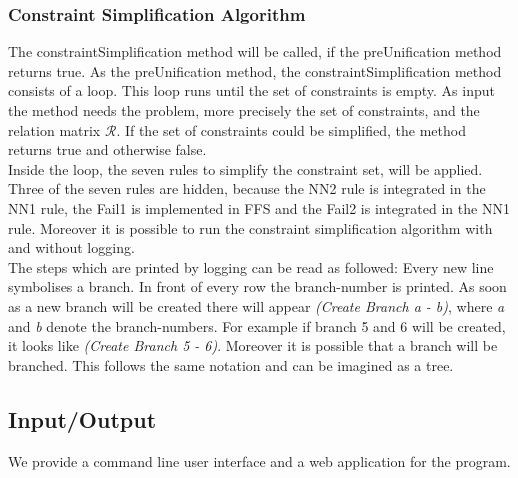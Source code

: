 \documentclass{article}
\begin{document}

\subsubsection{Constraint Simplification Algorithm}
The constraintSimplification method will be called, if the preUnification method returns true. As the preUnification method, the constraintSimplification method consists of a loop. This loop runs until the set of constraints is empty. As input the method needs the problem, more precisely the set of constraints, and the relation matrix \(\mathcal{R}\). If the set of constraints could be simplified, the method returns true and otherwise false.\\
Inside the loop, the seven rules to simplify the constraint set, will be applied. Three of the seven rules are hidden, because the NN2 rule is integrated in the NN1 rule, the Fail1 is implemented in FFS and the Fail2 is integrated in the NN1 rule. Moreover it is possible to run the constraint simplification algorithm with and without logging. \\
The steps which are printed by logging can be read as followed: 
Every new line symbolises a branch. In front of every row the branch-number is printed.
As soon as a new branch will be created there will appear \textit{(Create Branch a - b)}, where \textit{a} and \textit{b} denote the branch-numbers. For example if branch 5 and 6 will be created, it looks like \textit{(Create Branch 5 - 6)}. Moreover it is possible that a branch will be branched. This follows the same notation and can be imagined as a tree.


\subsection{Input/Output}

We provide a command line user interface and a web application for the program.
\end{document}
